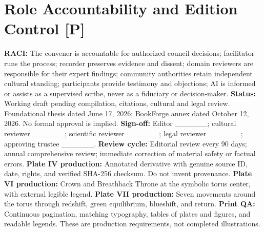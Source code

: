 \documentclass[12pt]{article}
\begin{document}
\section{Role Accountability and Edition Control [P]}
\textbf{RACI:} The convener is accountable for authorized council decisions; facilitator runs the process; recorder preserves evidence and dissent; domain reviewers are responsible for their expert findings; community authorities retain independent cultural standing; participants provide testimony and objections; AI is informed or assists as a supervised scribe, never as a fiduciary or decision-maker.
\textbf{Status:} Working draft pending compilation, citations, cultural and legal review. Foundational thesis dated June 17, 2026; BookForge annex dated October 12, 2026. No formal approval is implied.
\textbf{Sign-off:} Editor \_\_\_\_\_\_; cultural reviewer \_\_\_\_\_\_; scientific reviewer \_\_\_\_\_\_; legal reviewer \_\_\_\_\_\_; approving trustee \_\_\_\_\_\_.
\textbf{Review cycle:} Editorial review every 90 days; annual comprehensive review; immediate correction of material safety or factual errors.
\textbf{Plate IV production:} Annotated derivative with genuine source ID, date, rights, and verified SHA-256 checksum. Do not invent provenance.
\textbf{Plate VI production:} Crown and Breathback Throne at the symbolic torus center, with external legible legend.
\textbf{Plate VII production:} Seven movements around the torus through redshift, green equilibrium, blueshift, and return.
\textbf{Print QA:} Continuous pagination, matching typography, tables of plates and figures, and readable legends. These are production requirements, not completed illustrations.


\aftClosingPage
\end{document}
